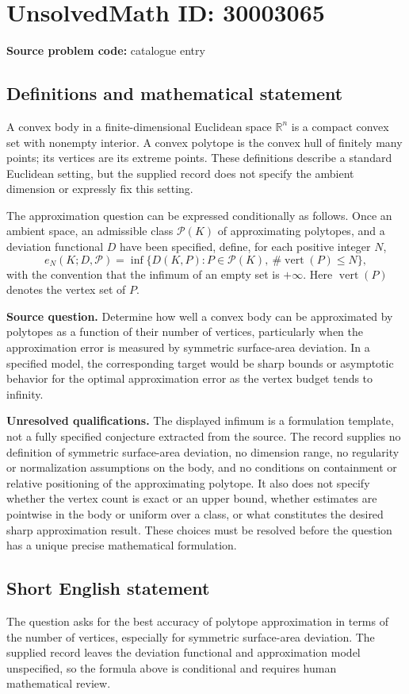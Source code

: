 \documentclass[11pt]{article}
\newcommand{\R}{\mathbb{R}}
\begin{document}
\section*{UnsolvedMath ID: 30003065}
\textbf{Source problem code:} catalogue entry
\subsection{Definitions and mathematical statement}
A convex body in a finite-dimensional Euclidean space \(\R^n\) is a compact convex set with nonempty interior. A convex polytope is the convex hull of finitely many points; its vertices are its extreme points. These definitions describe a standard Euclidean setting, but the supplied record does not specify the ambient dimension or expressly fix this setting.

The approximation question can be expressed conditionally as follows. Once an ambient space, an admissible class \(\mathcal P(K)\) of approximating polytopes, and a deviation functional \(D\) have been specified, define, for each positive integer \(N\),
\[
e_N(K;D,\mathcal P)
=
\inf\bigl\{D(K,P):P\in\mathcal P(K),\ \#\operatorname{vert}(P)\leq N\bigr\},
\]
with the convention that the infimum of an empty set is \(+\infty\). Here \(\operatorname{vert}(P)\) denotes the vertex set of \(P\).

\textbf{Source question.} Determine how well a convex body can be approximated by polytopes as a function of their number of vertices, particularly when the approximation error is measured by symmetric surface-area deviation. In a specified model, the corresponding target would be sharp bounds or asymptotic behavior for the optimal approximation error as the vertex budget tends to infinity.

\textbf{Unresolved qualifications.} The displayed infimum is a formulation template, not a fully specified conjecture extracted from the source. The record supplies no definition of symmetric surface-area deviation, no dimension range, no regularity or normalization assumptions on the body, and no conditions on containment or relative positioning of the approximating polytope. It also does not specify whether the vertex count is exact or an upper bound, whether estimates are pointwise in the body or uniform over a class, or what constitutes the desired sharp approximation result. These choices must be resolved before the question has a unique precise mathematical formulation.
\subsection{Short English statement}
The question asks for the best accuracy of polytope approximation in terms of the number of vertices, especially for symmetric surface-area deviation. The supplied record leaves the deviation functional and approximation model unspecified, so the formula above is conditional and requires human mathematical review.
\end{document}
